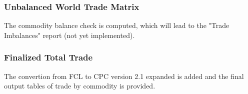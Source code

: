 \documentclass[nojss]{jss}\usepackage[]{graphicx}\usepackage[]{color}
\begin{document}
\subsubsection{Unbalanced World Trade Matrix}
The commodity balance check is computed, which will lead to the "Trade Imbalances" report (not yet implemented).

\subsubsection{Finalized Total Trade}
The convertion from FCL to CPC version 2.1 expanded is added and the final output tables of trade by commodity is provided.
\end{document}
